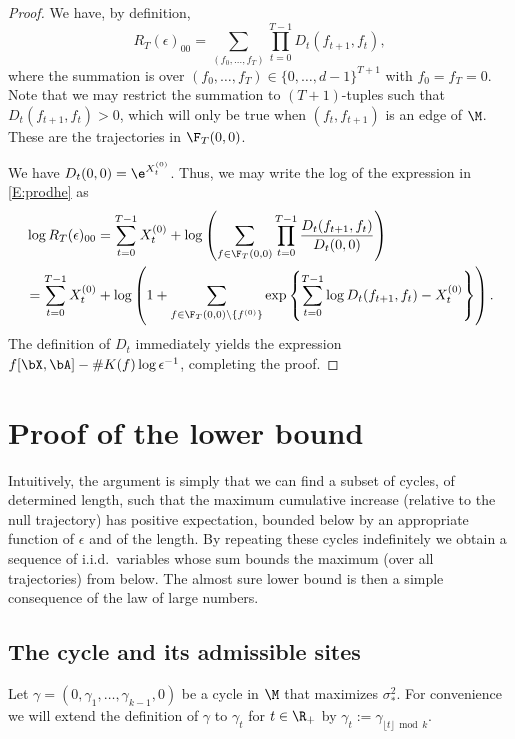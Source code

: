 \documentclass[11pt]{amsart}
\begin{document}
\begin{proof}
	We have, by definition,
	\begin{equation} \label{E:prodhe}
	R_{T}(\epsilon)_{00}=\sum_{(f_{0},\dots,f_{T})} \prod_{t=0}^{T-1} D_{t}(f_{t+1},f_{t}),
	\end{equation}
	where the summation is over $(f_{0},\dots,f_{T})\in \{0,\dots,d-1\}^{T+1}$ with
	$f_{0}=f_T = 0$. Note that we may restrict the summation to $(T+1)$-tuples such
	that $D_{t}(f_{t+1},f_{t})>0$, which will only be true when $(f_{t},f_{t+1})$ is an edge of $\M$.
	These are the trajectories in $\F_T(0,0)$.
	
	We have $D_{t}(0,0)=\e^{X_{t}^{(0)}}$. Thus, we may write the log of the expression in \eqref{E:prodhe} as
	\begin{align*} 
		&\log R_{T}(\epsilon)_{00} = \sum_{t=0}^{T-1} X_t^{(0)} +
		\log\left( \sum_{f\in \F_T(0,0)} \prod_{t=0}^{T-1} \frac{D_t(f_{t+1},f_t)}{D_t(0,0)} \right)\\
		&= \sum_{t=0}^{T-1} X_t^{(0)} +
		\log\left( 1 + \sum_{f\in \F_T(0,0)\setminus\{f^{(0)}\}} \exp\left\{
		\sum_{t=0}^{T-1} \log D_t(f_{t+1},f_t) - X_t^{(0)} \right\} \right) .
	\end{align*}
	The definition of $D_t$ immediately yields the expression $f[\bX,\bA] - \# K(f) \log \epsilon^{-1}$,	completing the proof.
\end{proof}


	
	


\section{Proof of the lower bound}  \label{sec:sameLB}
Intuitively, the argument is simply that we can find a subset of cycles, of determined length, such that the maximum cumulative increase (relative to the null trajectory) has positive expectation, bounded below by an appropriate function of $\epsilon$ and of the length.
By repeating these cycles indefinitely we obtain a sequence of i.i.d.\ variables whose sum bounds the maximum (over all trajectories) from below.
The almost sure lower bound is then a simple consequence of the law of large numbers.

\subsection{The cycle and its admissible sites}
Let $\gamma=(0,\gamma_1,\dots, \gamma_{k-1}, 0)$
be a cycle in $\M$ that maximizes $\sigma_*^2$.
For convenience we will extend the definition of $\gamma$ to $\gamma_t$ for $t\in\R_+$ by $\gamma_t:=\gamma_{\lfloor t \rfloor\, \operatorname{mod}\, k}$.
\end{document}
